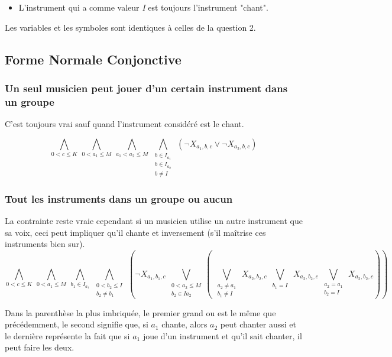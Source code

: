 \documentclass[11pt]{article}
\begin{document}
\begin{itemize}
\item L'instrument qui a comme valeur \textit{I} est toujours l'instrument "chant".
\end{itemize}

Les variables et les symboles sont identiques à celles de la question 2.

\subsection{Forme Normale Conjonctive}

\subsubsection{Un seul musicien peut jouer d'un certain instrument dans un groupe}

C'est toujours vrai sauf quand l'instrument considéré est le chant.

$$\bigwedge\limits_{0<c\le K}\ \bigwedge\limits_{0<a_1\le M}\ \bigwedge\limits_{a_1<a_2\le M}\ \bigwedge\limits_{\substack{b\in I_{a_1} \\ b\in I_{a_2} \\ b \ne I}}\ \left(\neg X_{a_1,b,c} \vee \neg X_{a_2,b,c}\right)$$

\subsubsection{Tout les instruments dans un groupe ou aucun}

La contrainte reste vraie cependant si un musicien utilise un autre instrument que sa voix, ceci peut impliquer qu'il chante et inversement (s'il maîtrise ces instruments bien sur).\\

$$\bigwedge\limits_{0<c\le K}\ \bigwedge\limits_{0<a_1\le M}\ \bigwedge\limits_{b_1\in I_{a_1}}\ \bigwedge\limits_{\substack{0<b_2\le I \\ b_2 \ne b_1}}\ \left(\neg X_{a_1,b_1,c} \ \bigvee\limits_{\substack{0<a_2\le M \\ b_2 \in I{a_2}}}\left( \
\bigvee\limits_{\substack{a_2 \ne a_1 \\ b_1 \ne I}}\  X_{a_2,b_2,c}\ 
\bigvee\limits_{\substack{b_1 = I}}\ X_{a_2,b_2,c}\ 
\bigvee\limits_{\substack{a_2 = a_1 \\ b_2 = I}}\ X_{a_2,b_2,c}\right)\right)$$

Dans la parenthèse la plus imbriquée, le premier grand ou est le même que précédemment, le second signifie que, si $a_1$ chante, alors $a_2$ peut chanter aussi et le dernière représente la fait que si $a_1$ joue d'un instrument et qu'il sait chanter, il peut faire les deux.
\end{document}
